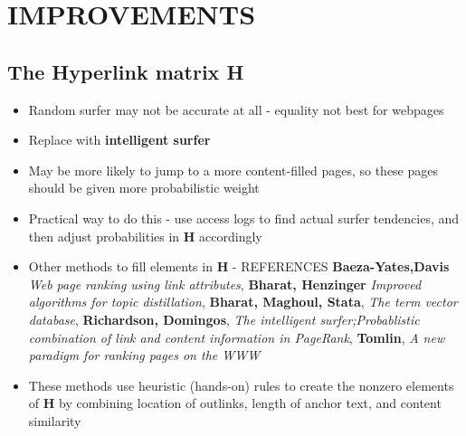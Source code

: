\documentclass[11pt]{report}
\begin{document}
\chapter{IMPROVEMENTS}
\section{The Hyperlink matrix \textbf{H}}
\begin{itemize}
\item Random surfer may not be accurate at all - equality not best for webpages
\item Replace with \textbf{intelligent surfer}
\item May be more likely to jump to a more content-filled pages, so these pages should be given more probabilistic weight
\item Practical way to do this - use access logs to find actual surfer tendencies, and then adjust probabilities in \textbf{H} accordingly
\item Other methods to fill elements in \textbf{H} - REFERENCES \textbf{Baeza-Yates,Davis} \textit{Web page ranking using link attributes}, \textbf{Bharat, Henzinger} \textit{Improved algorithms for topic distillation}, \textbf{Bharat, Maghoul, Stata}, \textit{The term vector database}, \textbf{Richardson, Domingos}, \textit{The intelligent surfer;Probablistic combination of link and content information in PageRank}, \textbf{Tomlin}, \textit{A new paradigm for ranking pages on the WWW}
\item These methods use heuristic (hands-on) rules to create the nonzero elements of \textbf{H} by combining location of outlinks, length of anchor text, and content similarity
\end{itemize}
\end{document}
